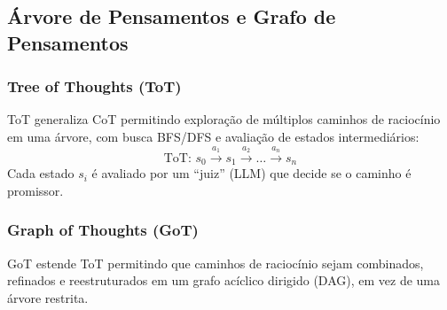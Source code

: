 \subsection{Árvore de Pensamentos e Grafo de Pensamentos}
\subsubsection*{Tree of Thoughts (ToT)}
ToT \cite{yao2023tree} generaliza CoT permitindo exploração de múltiplos
caminhos de raciocínio em uma árvore, com busca BFS/DFS e avaliação de
estados intermediários:
\[\text{ToT: } s_0 \xrightarrow{a_1} s_1 \xrightarrow{a_2} \ldots \xrightarrow{a_n} s_n
\]
Cada estado $s_i$ é avaliado por um ``juiz'' (LLM) que decide se o caminho
é promissor.
\subsubsection*{Graph of Thoughts (GoT)}
GoT \cite{besta2024graph} estende ToT permitindo que caminhos de raciocínio
sejam combinados, refinados e reestruturados em um grafo acíclico dirigido
(DAG), em vez de uma árvore restrita.
